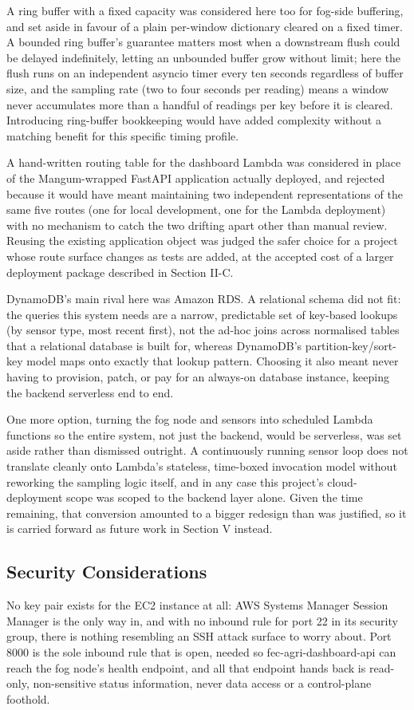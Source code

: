 \documentclass[conference]{IEEEtran}
\begin{document}
A ring buffer with a fixed capacity was considered here too for fog-side buffering, and set aside in favour of a plain per-window dictionary cleared on a fixed timer. A bounded ring buffer's guarantee matters most when a downstream flush could be delayed indefinitely, letting an unbounded buffer grow without limit; here the flush runs on an independent asyncio timer every ten seconds regardless of buffer size, and the sampling rate (two to four seconds per reading) means a window never accumulates more than a handful of readings per key before it is cleared. Introducing ring-buffer bookkeeping would have added complexity without a matching benefit for this specific timing profile.

A hand-written routing table for the dashboard Lambda was considered in place of the Mangum-wrapped FastAPI application actually deployed, and rejected because it would have meant maintaining two independent representations of the same five routes (one for local development, one for the Lambda deployment) with no mechanism to catch the two drifting apart other than manual review. Reusing the existing application object was judged the safer choice for a project whose route surface changes as tests are added, at the accepted cost of a larger deployment package described in Section II-C.

DynamoDB's main rival here was Amazon RDS. A relational schema did not fit: the queries this system needs are a narrow, predictable set of key-based lookups (by sensor type, most recent first), not the ad-hoc joins across normalised tables that a relational database is built for, whereas DynamoDB's partition-key/sort-key model maps onto exactly that lookup pattern. Choosing it also meant never having to provision, patch, or pay for an always-on database instance, keeping the backend serverless end to end.

One more option, turning the fog node and sensors into scheduled Lambda functions so the entire system, not just the backend, would be serverless, was set aside rather than dismissed outright. A continuously running sensor loop does not translate cleanly onto Lambda's stateless, time-boxed invocation model without reworking the sampling logic itself, and in any case this project's cloud-deployment scope was scoped to the backend layer alone. Given the time remaining, that conversion amounted to a bigger redesign than was justified, so it is carried forward as future work in Section V instead.

\subsection{Security Considerations}
No key pair exists for the EC2 instance at all: AWS Systems Manager Session Manager is the only way in, and with no inbound rule for port 22 in its security group, there is nothing resembling an SSH attack surface to worry about. Port 8000 is the sole inbound rule that is open, needed so fec-agri-dashboard-api can reach the fog node's health endpoint, and all that endpoint hands back is read-only, non-sensitive status information, never data access or a control-plane foothold.
\end{document}
